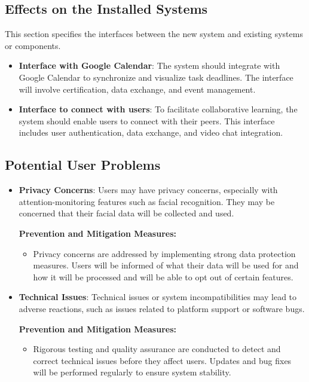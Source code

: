 \documentclass[12pt]{article}
\begin{document}
\subsection{Effects on the Installed Systems}
This section specifies the interfaces between the new system and existing systems or components.
\begin{itemize}
    \item \textbf{Interface with Google Calendar}: The system should integrate with Google Calendar to synchronize and visualize task deadlines. The interface will involve certification, data exchange, and event management.



    \item \textbf{Interface to connect with users}: To facilitate collaborative learning, the system should enable users to connect with their peers. This interface includes user authentication, data exchange, and video chat integration.

\end{itemize}
\subsection{Potential User Problems}
\begin{itemize}
    
    \item \textbf{Privacy Concerns}:
    Users may have privacy concerns, especially with attention-monitoring features such as facial recognition. They may be concerned that their facial data will be collected and used.
    
    \textbf{Prevention and Mitigation Measures:}
    \begin{itemize}
        \item Privacy concerns are addressed by implementing strong data protection measures. Users will be informed of what their data will be used for and how it will be processed and will be able to opt out of certain features.
    \end{itemize}
    
    \item \textbf{Technical Issues}:
    Technical issues or system incompatibilities may lead to adverse reactions, such as issues related to platform support or software bugs.
    
    \textbf{Prevention and Mitigation Measures:}
    \begin{itemize}
        \item Rigorous testing and quality assurance are conducted to detect and correct technical issues before they affect users. Updates and bug fixes will be performed regularly to ensure system stability.
    \end{itemize}
\end{itemize}
\end{document}
